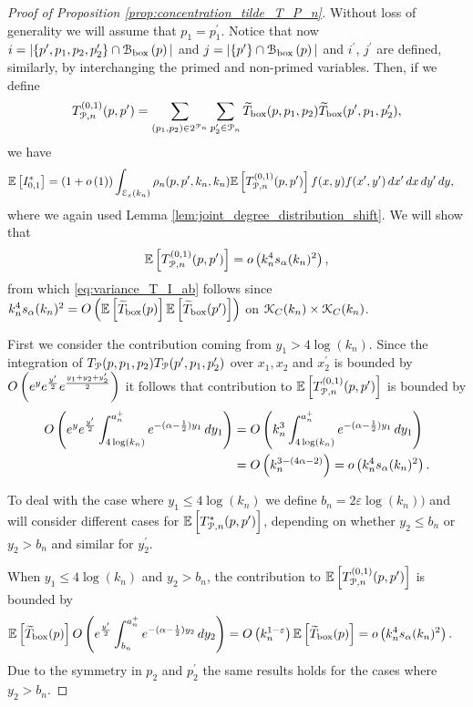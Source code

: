 \begin{proof}[Proof of Proposition \ref{prop:concentration_tilde_T_P_n}]
Without loss of generality we will assume that $p_1 = p_1^\prime$. Notice that now $i = |\{p^\prime, p_1, p_2, p_2^\prime\} \cap {\mathcal B}_{\text{box}}\left(p\right)|$ and $j = |\{p^\prime\} \cap {\mathcal B}_{\text{box}}\left(p\right)|$ and $i^\prime$, $j^\prime$ are defined, similarly, by interchanging the primed and non-primed variables. Then, if we define
\[
	T^{(0,1)}_{{\mathcal P},n}(p,p^\prime) = \sum_{(p_1,p_2) \in 2^{{\mathcal P}_n}} \sum_{p_2^\prime \in {\mathcal P}_n} \widetilde{T}_{\text{box}}(p,p_1,p_2) \widetilde{T}_{\text{box}}(p^\prime,p_1,p_2^\prime),
\]
we have
\begin{align*}
	\mathbb{E}\left[I_{0,1}^\ast\right] &= (1+o\left(1\right))\int_{\mathcal{E}_{\varepsilon}(k_n)} \rho_n(p,p^\prime,k_n,k_n)
			\mathbb{E}\left[T^{(0,1)}_{{\mathcal P},n}(p,p^\prime)\right] f(x,y)
			f(x^\prime,y^\prime) \, dx^\prime \, dx \, dy^\prime \, dy,
\end{align*} 
where we again used Lemma  \ref{lem:joint_degree_distribution_shift}.
We will show that 
\[
	\mathbb{E}\left[T^{(0,1)}_{{\mathcal P},n}(p,p^\prime)\right] = o\left(k_n^4 s_\alpha(k_n)^2\right),
\] 
from which \eqref{eq:variance_T_I_ab} follows since $k_n^4 s_\alpha(k_n)^2 = O\left(\mathbb{E}\left[\widetilde{T}_{\text{box}}(p)\right] \mathbb{E}\left[\widetilde{T}_{\text{box}}(p^\prime)\right]\right)$ on ${\mathcal K}_{C}(k_n) \times {\mathcal K}_{C}(k_n)$.

First we consider the contribution coming from $y_1 > 4 \log(k_n)$. Since the integration of $T_{{\mathcal P}}(p,p_1,p_2) T_{{\mathcal P}}(p^\prime,p_1,p_2^\prime)$ over $x_1, x_2$ and $x_2^\prime$ is bounded by $O\left(e^{y}e^{\frac{y^\prime}{2}} e^{\frac{y_1 + y_2 + y_2^\prime}{2}}\right)$ it follows that contribution to $\mathbb{E}\left[T^{(0,1)}_{{\mathcal P},n}(p,p^\prime)\right]$ is bounded by
\begin{align*}
	O\left(e^{y}e^{\frac{y^\prime}{2}} \int_{4\log(k_n)}^{a_n^+} e^{-(\alpha - \frac{1}{2})y_1} \, dy_1\right)
	&= O\left(k_n^3 \int_{4\log(k_n)}^{a_n^+} e^{-(\alpha - \frac{1}{2})y_1} \, dy_1\right)\\
	&= O\left(k_n^{3 - (4\alpha - 2)}\right) = o\left(k_n^4 s_\alpha(k_n)^2\right).
\end{align*}

To deal with the case where $y_1 \le 4\log(k_n)$ we define $b_n = 2\varepsilon\log(k_n))$ and will consider different cases for $\mathbb{E}\left[T^\ast_{{\mathcal P},n}(p,p^\prime)\right]$, depending on whether $y_2 \le b_n$ or $y_2 > b_n$ and similar for $y_2^\prime$. 

When $y_1 \le 4\log(k_n)$ and $y_2 > b_n$, the contribution to $\mathbb{E}\left[T^{(0,1)}_{{\mathcal P},n}(p,p^\prime)\right]$ is bounded by
\begin{align*}
	\mathbb{E}\left[\widetilde{T}_{\text{box}}(p)\right]
		O\left(e^{\frac{y^\prime}{2}}\int_{b_n}^{a_n^+} e^{-(\alpha -\frac{1}{2})y_2} \, dy_2\right)
	&= O\left(k_n^{1 - \varepsilon}\right)\mathbb{E}\left[\widetilde{T}_{\text{box}}(p)\right]
	= o\left(k_n^4 s_\alpha(k_n)^2\right).
\end{align*}
Due to the symmetry in $p_2$ and $p_2^\prime$ the same results holds for the cases where $y_2 > b_n$.


\end{proof}
